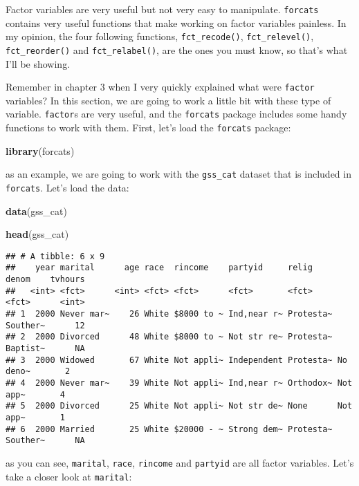 \documentclass[
]{article}
\newenvironment{Shaded}{\begin{snugshade}}{\end{snugshade}}
\newcommand{\KeywordTok}[1]{\textcolor[rgb]{0.13,0.29,0.53}{\textbf{#1}}}
\newcommand{\NormalTok}[1]{#1}
\begin{document}
Factor variables are very useful but not very easy to manipulate. \texttt{forcats} contains very useful
functions that make working on factor variables painless. In my opinion, the four following functions, \texttt{fct\_recode()}, \texttt{fct\_relevel()}, \texttt{fct\_reorder()} and \texttt{fct\_relabel()}, are the ones you must
know, so that's what I'll be showing.

Remember in chapter 3 when I very quickly explained what were \texttt{factor} variables? In this section,
we are going to work a little bit with these type of variable. \texttt{factor}s are very useful, and the
\texttt{forcats} package includes some handy functions to work with them. First, let's load the \texttt{forcats} package:

\begin{Shaded}
\begin{Highlighting}[]
\KeywordTok{library}\NormalTok{(forcats)}
\end{Highlighting}
\end{Shaded}

as an example, we are going to work with the \texttt{gss\_cat} dataset that is included in \texttt{forcats}. Let's
load the data:

\begin{Shaded}
\begin{Highlighting}[]
\KeywordTok{data}\NormalTok{(gss\_cat)}

\KeywordTok{head}\NormalTok{(gss\_cat)}
\end{Highlighting}
\end{Shaded}

\begin{verbatim}
## # A tibble: 6 x 9
##    year marital      age race  rincome    partyid     relig     denom    tvhours
##   <int> <fct>      <int> <fct> <fct>      <fct>       <fct>     <fct>      <int>
## 1  2000 Never mar~    26 White $8000 to ~ Ind,near r~ Protesta~ Souther~      12
## 2  2000 Divorced      48 White $8000 to ~ Not str re~ Protesta~ Baptist~      NA
## 3  2000 Widowed       67 White Not appli~ Independent Protesta~ No deno~       2
## 4  2000 Never mar~    39 White Not appli~ Ind,near r~ Orthodox~ Not app~       4
## 5  2000 Divorced      25 White Not appli~ Not str de~ None      Not app~       1
## 6  2000 Married       25 White $20000 - ~ Strong dem~ Protesta~ Souther~      NA
\end{verbatim}

as you can see, \texttt{marital}, \texttt{race}, \texttt{rincome} and \texttt{partyid} are all factor variables. Let's take a closer
look at \texttt{marital}:
\end{document}
